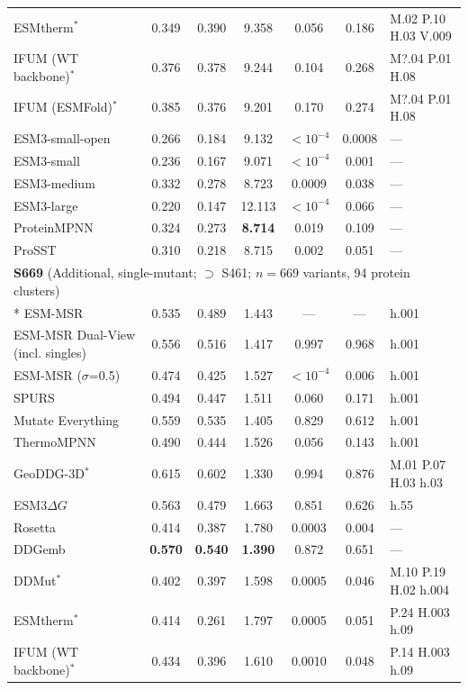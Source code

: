 {\begin{longtable}{lcccccl}
ESMtherm$^*$ & 0.349 & 0.390 & 9.358 & 0.056 & 0.186 & M.02 P.10 H.03 V.009 \\
IFUM (WT backbone)$^*$ & 0.376 & 0.378 & 9.244 & 0.104 & 0.268 & M?.04 P.01 H.08 \\
IFUM (ESMFold)$^*$ & 0.385 & 0.376 & 9.201 & 0.170 & 0.274 & M?.04 P.01 H.08 \\
ESM3-small-open & 0.266 & 0.184 & 9.132 & $<10^{-4}$ & 0.0008 & --- \\
ESM3-small & 0.236 & 0.167 & 9.071 & $<10^{-4}$ & 0.001 & --- \\
ESM3-medium & 0.332 & 0.278 & 8.723 & 0.0009 & 0.038 & --- \\
ESM3-large & 0.220 & 0.147 & 12.113 & $<10^{-4}$ & 0.066 & --- \\
ProteinMPNN & 0.324 & 0.273 & \textbf{8.714} & 0.019 & 0.109 & --- \\
ProSST & 0.310 & 0.218 & 8.715 & 0.002 & 0.051 & --- \\
\midrule
\multicolumn{7}{l}{\textbf{S669} (Additional, single-mutant; $\supset$ S461; $n=669$ variants, 94 protein clusters)} \\*
\midrule
ESM-MSR & 0.535 & 0.489 & 1.443 & --- & --- & h.001 \\
ESM-MSR Dual-View (incl. singles) & 0.556 & 0.516 & 1.417 & 0.997 & 0.968 & h.001 \\
ESM-MSR ($\sigma$=0.5) & 0.474 & 0.425 & 1.527 & $<10^{-4}$ & 0.006 & h.001 \\
SPURS & 0.494 & 0.447 & 1.511 & 0.060 & 0.171 & h.001 \\
Mutate Everything & 0.559 & 0.535 & 1.405 & 0.829 & 0.612 & h.001 \\
ThermoMPNN & 0.490 & 0.444 & 1.526 & 0.056 & 0.143 & h.001 \\
GeoDDG-3D$^*$ & 0.615 & 0.602 & 1.330 & 0.994 & 0.876 & M.01 P.07 H.03 h.03 \\
ESM3$\Delta G$ & 0.563 & 0.479 & 1.663 & 0.851 & 0.626 & h.55 \\
Rosetta & 0.414 & 0.387 & 1.780 & 0.0003 & 0.004 & --- \\
DDGemb & \textbf{0.570} & \textbf{0.540} & \textbf{1.390} & 0.872 & 0.651 & --- \\
DDMut$^*$ & 0.402 & 0.397 & 1.598 & 0.0005 & 0.046 & M.10 P.19 H.02 h.004 \\
ESMtherm$^*$ & 0.414 & 0.261 & 1.797 & 0.0005 & 0.051 & P.24 H.003 h.09 \\
IFUM (WT backbone)$^*$ & 0.434 & 0.396 & 1.610 & 0.0010 & 0.048 & P.14 H.003 h.09 \\

\end{longtable}}
